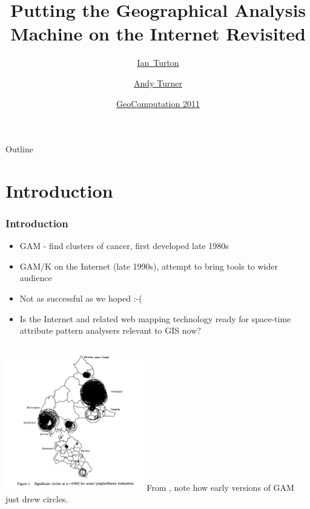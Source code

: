 \documentclass{beamer}
\title[GAM Revisited] %
{Putting the Geographical Analysis Machine on the Internet Revisited}
\author[Turton, Turner] %
{\href{http://www.ccg.leeds.ac.uk/people/i.turton/}{Ian~Turton\inst{1}} \and \href{http://www.geog.leeds.ac.uk/people/a.turner/}{Andy Turner}\inst{2}}
\institute[ ] %
{
  \inst{1}%
Independent Researcher\\
  ijturton@gmail.com
  \and
  \inst{2}%
  \href{http://www.ccg.leeds.ac.uk/}{Centre for Computational Geography}\\
  \href{http://www.leeds.ac.uk/}{University of Leeds}\\
  A.G.D.Turner@leeds.ac.uk}
\date[ ] %
{\href{http://standard.cege.ucl.ac.uk/workshops/Geocomputation/}{GeoComputation 2011}}
\begin{document}
\begin{frame}
  \titlepage
\end{frame}

\begin{frame}{Outline}
  \tableofcontents
\end{frame}


\section{Introduction}
\begin{frame}[t]
\frametitle{Introduction}
\begin{itemize}
\item GAM - find clusters of cancer, first developed late 1980s
\item GAM/K on the Internet (late 1990s), attempt to bring tools to wider audience
\item Not as successful as we hoped :-(
\item Is the Internet and related web mapping technology ready for space-time attribute pattern analysers relevant to GIS now?
\end{itemize}
\end{frame}
\begin{frame}
\begin{columns}
\includegraphics[height=6.0cm]{first_gam.png}
From \citet{citeulike:5207314}, note how early versions of GAM just drew circles.
\end{columns}
\end{frame}
\end{document}
